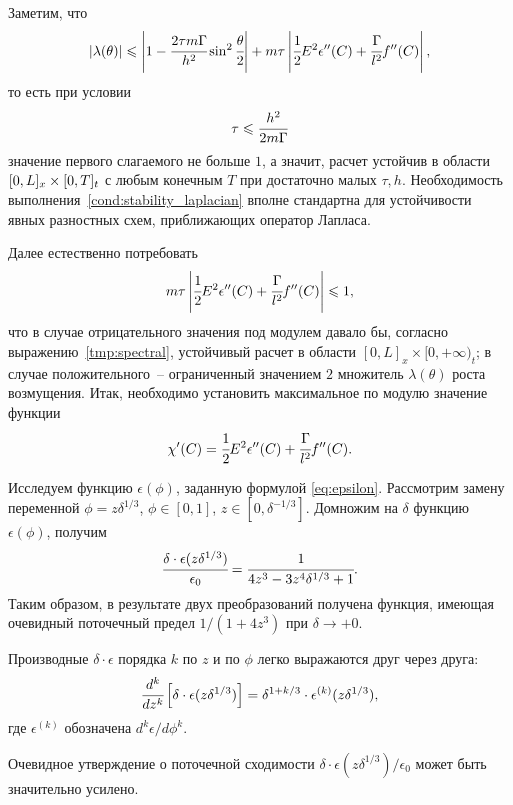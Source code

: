 Заметим, что
\[
    |\lambda(\theta)| \leqslant \left| 1 - \cfrac{2 \tau m \Gamma}{h^2} \sin^2 \cfrac{\theta}{2} \right| + m \tau \left| \cfrac{1}{2} E^2 \epsilon''(C) + \cfrac{\Gamma}{l^2} f''(C) \right|,
\]
то есть при условии
\begin{equation}
    \tau \leqslant \cfrac{h^2}{2m \Gamma}
    \label{cond:stability_laplacian}
\end{equation}
значение первого слагаемого не больше $1$, а значит, расчет устойчив в области $[0, L]_x \hm \times [0, T]_t$ с любым конечным $T$ при достаточно малых $\tau, h$. Необходимость выполнения~\eqref{cond:stability_laplacian} вполне стандартна для устойчивости явных разностных схем, приближающих оператор Лапласа.

Далее естественно потребовать
\begin{equation}
    m \tau \left| \cfrac{1}{2} E^2 \epsilon''(C) + \cfrac{\Gamma}{l^2} f''(C) \right| \leqslant 1,
    \label{cond:stability_function_general}
\end{equation}
что в случае отрицательного значения под модулем давало бы, согласно выраже\forcehyphenation нию~\eqref{tmp:spectral}, устойчивый расчет в области $[0, L]_x \times [0, +\infty)_t$; в случае положительного~-- ограниченный значением $2$ множитель $\lambda(\theta)$ роста возмущения. Итак, необходимо установить максимальное по модулю значение функции
\begin{equation}
    \chi'(C) = \cfrac{1}{2} E^2 \epsilon''(C) + \cfrac{\Gamma}{l^2} f''(C).
    \label{eq:equilibrium_characteristic_deriv}
\end{equation}

Исследуем функцию $\epsilon(\phi)$, заданную формулой \eqref{eq:epsilon}. Рассмотрим замену переменной $\phi = z\delta^{1/3}$, $\phi \in [0, 1]$, $z \in [0, \delta^{-1/3}]$. Домножим на $\delta$ функцию $\epsilon(\phi)$, получим
\[
    \cfrac{\delta \cdot \epsilon(z \delta^{1/3})}{\epsilon_0} = \cfrac{1}{4 z^3 - 3 z^4 \delta^{1/3} + 1}.
\]
Таким образом, в результате двух преобразований получена функция, имеющая очевидный поточечный предел $1/(1 + 4 z^3)$ при $\delta \to +0$.

Производные $\delta \cdot \epsilon$ порядка $k$ по $z$ и по $\phi$ легко выражаются друг через друга:
\[
    \cfrac{d^k}{d z^k} \left[ \delta \cdot \epsilon(z \delta^{1/3}) \right] = \delta^{1 + k/3} \cdot \epsilon^{(k)}(z \delta^{1/3}),
\]
где $\epsilon^{(k)}$ обозначена $d^k \epsilon / d \phi^k$.

Очевидное утверждение о поточечной сходимости $\delta \cdot \epsilon(z \delta^{1/3}) / \epsilon_0$ может быть значительно усилено.

